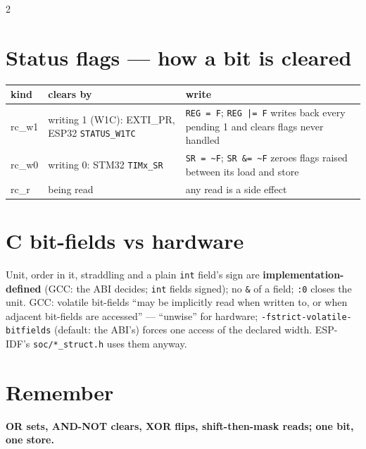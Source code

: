 \documentclass[8pt]{extarticle}
\newcommand\ct[1]{\texttt{#1}}
\newcommand\bitrow[4]{%
  \foreach \bb [count=\j from 0] in #3 {%
    \ifnum\bb=1 \node[sb, fill=#4] at (#1+\j*0.32, #2) {1};%
    \else \node[sb] at (#1+\j*0.32, #2) {0};\fi}}
\begin{document}
\begin{multicols}{2}
\section{Status flags — how a bit is cleared}
{\scriptsize\setlength{\tabcolsep}{2pt}
\begin{tabular}{@{}>{\ttfamily\raggedright\arraybackslash}p{7mm}>{\raggedright\arraybackslash}p{25mm}>{\raggedright\arraybackslash}p{45mm}@{}}
\toprule
\textbf{\normalfont kind} & \textbf{clears by} & \textbf{write}\\
\midrule
rc\_w1 & writing 1 (W1C): EXTI\_PR, ESP32 \ct{STATUS\_W1TC} & \ct{REG = F}; \ct{REG |= F}
  writes back every pending 1 and clears flags never handled\\
rc\_w0 & writing 0: STM32 \ct{TIMx\_SR} & \ct{SR = \textasciitilde F}; \ct{SR \&= \textasciitilde F}
  zeroes flags raised between its load and store\\
rc\_r & being read & any read is a side effect\\
\bottomrule
\end{tabular}}

\section{C bit-fields vs hardware}
Unit, order in it, straddling and a plain \ct{int} field's sign are
\textbf{implementation-defined} (GCC: the ABI decides; \ct{int} fields signed); no
\ct{\&} of a field; \ct{:0} closes the unit. GCC: volatile bit-fields ``may be
implicitly read when written to, or when adjacent bit-fields are accessed'' —
``unwise'' for hardware; \ct{-fstrict-volatile-bitfields} (default: the ABI's) forces
one access of the declared width. ESP-IDF's \ct{soc/*\_struct.h} uses them anyway.

\section{Remember}
\textbf{OR sets, AND-NOT clears, XOR flips, shift-then-mask reads; one bit, one store.}

\end{multicols}

\end{document}
